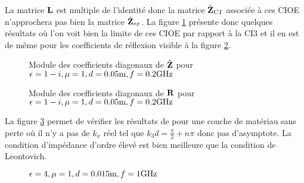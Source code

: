       La matrice \(\mathbf{L}\) est multiple de l'identité donc la matrice \(\hat{\mathbf{Z}}_{CI}\) associée à ces CIOE n'approchera pas bien la matrice \(\hat{\mathbf{Z}}_{ex}\). La figure \ref{fig:imp_fourier:plan:stupfel:hoibc} présente donc quelques résultats où l'on voit bien la limite de ces CIOE par rapport à la CI3 et il en est de même pour les coefficients de réflexion visible à la figure \ref{fig:reflex_fourier:plan:stupfel:hoibc}.
      \begin{figure}[!hbt]
        \centering
        
        \caption[CIOE sur empilement de B.~Stupfel p.~1661]{Module des coefficients diagonaux de \(\hat{\mathbf{Z}}\) pour \(\epsilon = 1-i, \mu = 1, d=0.05\text{m}, f=0.2\text{GHz}\)}
        \label{fig:imp_fourier:plan:stupfel:hoibc}
      \end{figure}
      \begin{table}[!hbt]
        \centering

        \caption{Coefficients associés à la figure \ref{fig:imp_fourier:plan:stupfel:hoibc}}
        \label{tab:imp_fourier:plan:stupfel:hoibc}
      \end{table}
      
      \begin{figure}[!hbt]
        \centering
        
        \caption[CIOE sur empilement de B.~Stupfel p.~1661]{Module des coefficients diagonaux de \(\mathbf{R}\) pour \(\epsilon = 1-i, \mu = 1, d=0.05\text{m}, f=0.2\text{GHz}\)}
        \label{fig:reflex_fourier:plan:stupfel:hoibc}
      \end{figure}

      La figure \ref{fig:imp_fourier:plan:hoppe:33:hoibc} permet de vérifier les résultats de \cite[p.~33]{hoppe_impedance_1995} pour une couche de matériau sans perte où il n'y a pas de \(k_x\) réel tel que \(k_3d=\frac{\pi}{2} + n \pi\) donc pas d'asymptote. La condition d'impédance d'ordre élevé est bien meilleure que la condition de Leontovich.
      \begin{figure}[!hbt]
          \centering
          
          \caption[CIOE sur empilement de Hoppe & Rahmat-Samii p.~33]{\(\epsilon = 4, \mu = 1, d=0.015\text{m}, f=1\text{GHz}\)}
          \label{fig:imp_fourier:plan:hoppe:33:hoibc}
      \end{figure}
      \begin{table}[!hbt]
        \centering
        \caption{Coefficients associés à la figure \ref{fig:imp_fourier:plan:hoppe:33:hoibc}}
        \label{tab:imp_fourier:plan:hoppe:33:hoibc}
      \end{table}

